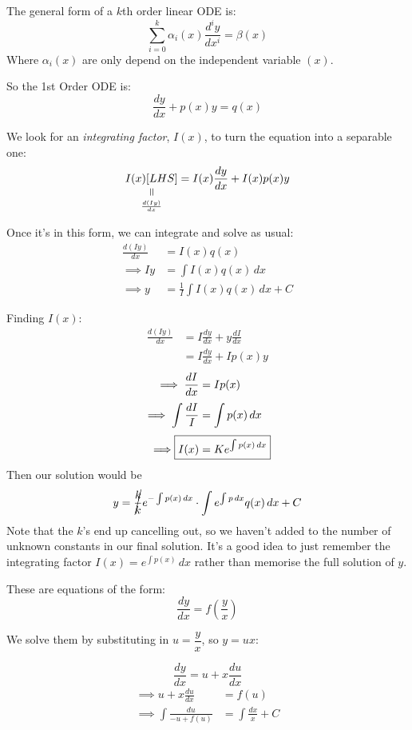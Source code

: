 \documentclass[10pt]{scrartcl}
\begin{document}

The general form of a $k$th order linear ODE is: 
\[\sum_{i=0}^k \alpha_i(x) \frac{d^iy}{dx^i} = \beta (x)\]
Where $\alpha_i(x)$ are only depend on the independent variable $(x)$. 

So the 1st Order ODE is: 
\[\frac{dy}{dx} + p(x)y = q(x)\]

We look for an \emph{integrating factor}, $I(x)$, to turn the equation into a separable one: 
\[\equalto{I(x)[LHS]}{\frac{d(Iy)}{dx}} = I(x)\frac{dy}{dx} + I(x)p(x)y\]

Once it's in this form, we can integrate and solve as usual: 
\[
\begin{aligned}
  \frac{d(Iy)}{dx} &= I(x)q(x)\\
  \implies Iy &= \int I(x)q(x)\,dx\\
  \implies y &= \frac{1}{I} \int I(x)q(x)\,dx + C
\end{aligned}
\]

Finding $I(x)$: 
\begin{align*}
    \frac{d(Iy)}{dx} &= I\frac{dy}{dx} + y\frac{dI}{dx}\\
    &= I\frac{dy}{dx} + Ip(x)y
\end{align*}
\[
\begin{aligned}
 \implies  \frac{dI}{dx} &= Ip(x)\\[.1cm]
  \implies \int \frac{dI}{I} &= \int p(x)\,dx\\[.1cm]
  \implies \Aboxed{I(x) &= Ke^{\int p(x)\,dx}}
\end{aligned}
\]
Then our solution would be
\[y = \cancel{\frac{k}{k}} e^{-\int p(x)\,dx}\cdot \int e^{\int p\,dx}q(x)\,dx + C\]
Note that the $k$'s end up cancelling out, so we haven't added to the number of unknown constants in our final solution. It's a good idea to just remember the integrating factor $I(x) = e^{\int p(x)}\,dx$ rather than memorise the full solution of $y$. 

These are equations of the form: 
\[\frac{dy}{dx} = f\left(\frac{y}{x}\right)\]

We solve them by substituting in $u = \dfrac{y}{x}$, so $y = ux$:

\[
    \frac{dy}{dx} = u + x \frac{du}{dx}
\]
\[
\begin{aligned}
  \implies u + x\frac{du}{dx} &= f(u)\\
  \implies \int \frac{du}{-u + f(u)} &= \int \frac{dx}{x} + C
\end{aligned}
\]
\end{document}
